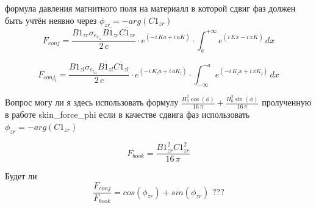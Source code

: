 \documentclass[11pt]{article}
\makeatletter
\newcommand{\boxspacing}{\kern\kvtcb@left@rule\kern\kvtcb@boxsep}
\newcommand{\prompt}[4]{
        {\ttfamily\llap{{\color{#2}[#3]:\hspace{3pt}#4}}\vspace{-\baselineskip}}
    }
\makeatother
\begin{document}




    формула давления магнитного поля на материалл в которой сдвиг фаз должен
быть учтён неявно через \(\phi_{zr} = - arg(C1_{zr})\)
\[F_{conj} = \frac{\mathit{B1}_{\mathit{zr}} \sigma_{e_{r_{\mathit{zz}}}} \overline{\mathit{B1}_{\mathit{zr}}} \overline{\mathit{C1}_{\mathit{zr}}}  }{2 \, c} \cdot e^{\left(-i \, K a + i \, a \overline{K}\right)} \cdot \int_{a}^{+\infty} e^{\left(i \, K x - i \, x \overline{K}\right)}\,{d x}\]

    \[F_{conj_l} = \frac{\mathit{B1}_{\mathit{zl}} \sigma_{e_{l_{\mathit{zz}}}} \overline{\mathit{B1}_{\mathit{zl}}} \overline{\mathit{C1}_{\mathit{zl}}}  }{2 \, c} \cdot e^{\left(-i \, K_{l} a + i \, a \overline{K_{l}}\right)} \cdot \int_{-\infty}^{-a} e^{\left(-i \, K_{l} x + i \, x \overline{K_{l}}\right)}\,{d x}\]

    Вопрос могу ли я здесь использовать формулу
\(\frac{H_{0}^{2} \cos\left(\phi\right)}{16 \, \pi} + \frac{H_{0}^{2} \sin\left(\phi\right)}{16 \, \pi}\)
пролученную в работе skin\_force\_phi если в качестве сдвига фаз
использовать \(\phi_{zr} = - arg(C1_{zr})\)

    \[F_{book} = \frac{\mathit{B1}_{\mathit{zr}}^{2} \mathit{C1}_{\mathit{zr}}^{2} }{16 \, \pi}\]

    Будет ли
\[\frac{F_{conj}}{F_{book}} = cos\left(\phi_{zr}\right) + sin\left(\phi_{zr}\right) \,\, ???\]
\end{document}
